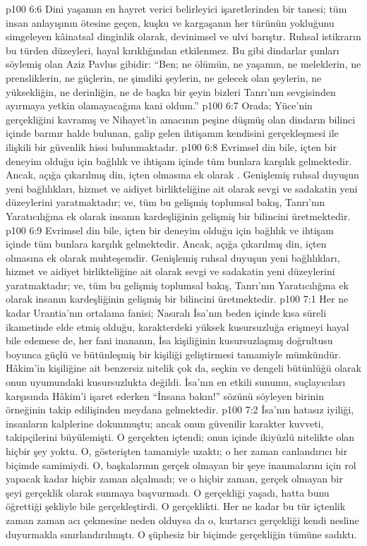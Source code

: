 \vs p100 6:6 Dini yaşamın en hayret verici belirleyici işaretlerinden bir tanesi; tüm insan anlayışının ötesine geçen, kuşku ve kargaşanın her türünün yokluğunu simgeleyen kâinatsal dinginlik olarak, devinimsel ve ulvi barıştır. Ruhsal istikrarın bu türden düzeyleri, hayal kırıklığından etkilenmez. Bu gibi dindarlar şunları söylemiş olan Aziz Pavlus gibidir: “Ben; ne ölümün, ne yaşamın, ne meleklerin, ne prensliklerin, ne güçlerin, ne şimdiki şeylerin, ne gelecek olan şeylerin, ne yüksekliğin, ne derinliğin, ne de başka bir şeyin bizleri Tanrı’nın sevgisinden ayırmaya yetkin olamayacağına kani oldum.”
\vs p100 6:7 Orada; Yüce’nin gerçekliğini kavramış ve Nihayet’in amacının peşine düşmüş olan dindarın bilinci içinde barınır halde bulunan, galip gelen ihtişamın kendisini gerçekleşmesi ile ilişkili bir güvenlik hissi bulunmaktadır.
\vs p100 6:8 Evrimsel din bile, içten bir deneyim olduğu için bağlılık ve ihtişam içinde tüm bunlara karşılık gelmektedir. Ancak, açığa çıkarılmış din, içten olmasına ek olarak . Genişlemiş ruhsal duyuşun yeni bağlılıkları, hizmet ve aidiyet birlikteliğine ait olarak sevgi ve sadakatin yeni düzeylerini yaratmaktadır; ve, tüm bu gelişmiş toplumsal bakış, Tanrı’nın Yaratıcılığına ek olarak insanın kardeşliğinin gelişmiş bir bilincini üretmektedir.
\vs p100 6:9 Evrimsel din bile, içten bir deneyim olduğu için bağlılık ve ihtişam içinde tüm bunlara karşılık gelmektedir. Ancak, açığa çıkarılmış din, içten olmasına ek olarak muhteşemdir. Genişlemiş ruhsal duyuşun yeni bağlılıkları, hizmet ve aidiyet birlikteliğine ait olarak sevgi ve sadakatin yeni düzeylerini yaratmaktadır; ve, tüm bu gelişmiş toplumsal bakış, Tanrı’nın Yaratıcılığına ek olarak insanın kardeşliğinin gelişmiş bir bilincini üretmektedir.
\vs p100 7:1 Her ne kadar Urantia’nın ortalama fanisi; Nasıralı İsa’nın beden içinde kısa süreli ikametinde elde etmiş olduğu, karakterdeki yüksek kusursuzluğa erişmeyi hayal bile edemese de, her fani inananın, İsa kişiliğinin kusursuzlaşmış doğrultusu boyunca güçlü ve bütünleşmiş bir kişiliği geliştirmesi tamamiyle mümkündür. Hâkim’in kişiliğine ait benzersiz nitelik çok da, seçkin ve dengeli bütünlüğü olarak onun uyumundaki kusursuzlukta değildi. İsa’nın en etkili sunumu, suçlayıcıları karşısında Hâkim’i işaret ederken “İnsana bakın!” sözünü söyleyen birinin örneğinin takip edilişinden meydana gelmektedir.
\vs p100 7:2 İsa’nın hatasız iyiliği, insanların kalplerine dokunmuştu; ancak onun güvenilir karakter kuvveti, takipçilerini büyülemişti. O gerçekten içtendi; onun içinde ikiyüzlü nitelikte olan hiçbir şey yoktu. O, gösterişten tamamiyle uzaktı; o her zaman canlandırıcı bir biçimde samimiydi. O, başkalarının gerçek olmayan bir şeye inanmalarını için rol yapacak kadar hiçbir zaman alçalmadı; ve o hiçbir zaman, gerçek olmayan bir şeyi gerçeklik olarak sunmaya başvurmadı. O gerçekliği yaşadı, hatta bunu öğrettiği şekliyle bile gerçekleştirdi. O gerçeklikti. Her ne kadar bu tür içtenlik zaman zaman acı çekmesine neden olduysa da o, kurtarıcı gerçekliği kendi nesline duyurmakla sınırlandırılmıştı. O şüphesiz bir biçimde gerçekliğin tümüne sadıktı.
